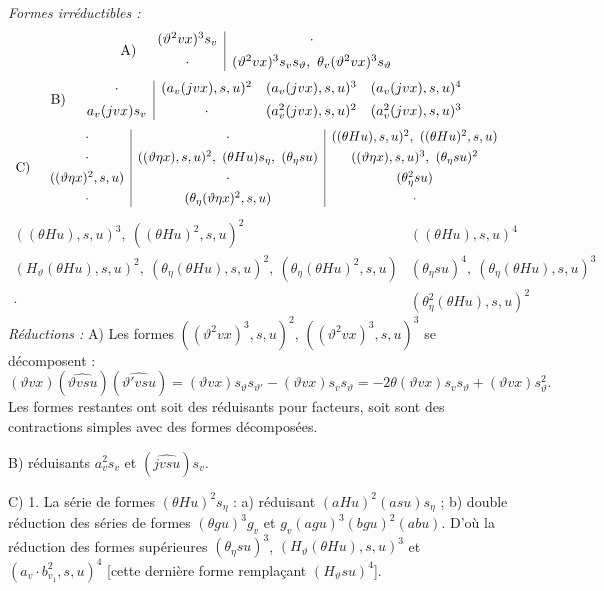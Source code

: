 \documentclass[11pt]{article}
\begin{document}
\noindent\emph{Formes irréductibles :}
\[
\begin{array}{r@{\quad}c}
\text{A)}&
\begin{array}{c|c}
(\vartheta^2v x)^3s_v&\cdot\\[0.45em]
\cdot&(\vartheta^2v x)^3s_v s_\vartheta,\ \theta_v(\vartheta^2v x)^3s_\vartheta
\end{array}
\end{array}
\]
\[
\begin{array}{r@{\quad}c}
\text{B)}&
\begin{array}{c|ccc}
\cdot&(a_v(jv x),s,u)^2&(a_v(jv x),s,u)^3&(a_v(jv x),s,u)^4\\[0.45em]
a_v(jv x)s_v&\cdot&(a_v^2(jv x),s,u)^2&(a_v^2(jv x),s,u)^3
\end{array}
\end{array}
\]
\[
\begin{array}{r@{\quad}c}
\text{C)}&
\begin{array}{c|c|c}
\cdot&\cdot&((\theta Hu),s,u)^2,\ ((\theta Hu)^2,s,u)\\[0.35em]
\cdot&((\vartheta\eta x),s,u)^2,\ (\theta Hu)s_\eta,\ (\theta_\eta su)&((\vartheta\eta x),s,u)^3,\ (\theta_\eta su)^2\\[0.35em]
((\vartheta\eta x)^2,s,u)&\cdot&(\theta_\eta^2su)\\[0.35em]
\cdot&(\theta_\eta(\vartheta\eta x)^2,s,u)&\cdot
\end{array}
\end{array}
\]
\[
\begin{array}{c|c}
((\theta Hu),s,u)^3,\ ((\theta Hu)^2,s,u)^2&((\theta Hu),s,u)^4\\[0.45em]
(H_\vartheta(\theta Hu),s,u)^2,\ (\theta_\eta(\theta Hu),s,u)^2,\ (\theta_\eta(\theta Hu)^2,s,u)&(\theta_\eta su)^4,\ (\theta_\eta(\theta Hu),s,u)^3\\[0.45em]
\cdot&(\theta_\eta^2(\theta Hu),s,u)^2
\end{array}
\]
\noindent\emph{Réductions :}
A) Les formes $((\vartheta^2v x)^3,s,u)^2$, $((\vartheta^2v x)^3,s,u)^3$ se décomposent :
\[
(\vartheta v x)(\widehat{\vartheta v su})(\widehat{\vartheta'v su})
=(\vartheta v x)s_\vartheta s_{\vartheta'}-(\vartheta v x)s_v s_\vartheta
=-2\theta(\vartheta v x)s_v s_\vartheta+(\vartheta v x)s_\vartheta^2.
\]
Les formes restantes ont soit des réduisants pour facteurs, soit sont des contractions simples avec des formes décomposées.

B) réduisants $a_v^2s_v$ et $(\widehat{jv su})s_v$.

C) 1. La série de formes $(\theta Hu)^2s_\eta$ : a) réduisant $(aHu)^2(asu)s_\eta$ ; b) double réduction des séries de formes $(\theta gu)^3g_v$ et $g_v(agu)^3(bgu)^2(abu)$. D'où la réduction des formes supérieures $(\theta_\eta su)^3$, $(H_\vartheta(\theta Hu),s,u)^3$ et $(a_v\cdot b_{v_1}^2,s,u)^4$ [cette dernière forme remplaçant $(H_\vartheta su)^4$].
\end{document}
